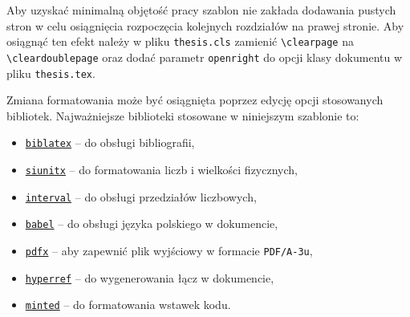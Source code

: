 Aby uzyskać minimalną objętość pracy szablon nie zakłada dodawania pustych stron w celu osiągnięcia rozpoczęcia kolejnych rozdziałów na prawej stronie. Aby osiągnąć ten efekt należy w pliku \verb|thesis.cls| zamienić \verb|\clearpage| na \verb|\cleardoublepage| oraz dodać parametr \verb|openright| do opcji klasy dokumentu w pliku \verb|thesis.tex|.

Zmiana formatowania może być osiągnięta poprzez edycję opcji stosowanych bibliotek. Najważniejsze biblioteki stosowane w niniejszym szablonie to:
\begin{itemize}
\item \texttt{\href{https://ctan.org/pkg/biblatex}{biblatex}} -- do obsługi bibliografii,
\item \texttt{\href{https://ctan.org/pkg/siunitx}{siunitx}} -- do formatowania liczb i wielkości fizycznych,
\item \texttt{\href{https://ctan.org/pkg/interval}{interval}} -- do obsługi przedziałów liczbowych,
\item \texttt{\href{https://ctan.org/pkg/babel-polish}{babel}} -- do obsługi języka polskiego w dokumencie,
\item \texttt{\href{https://ctan.org/pkg/pdfx}{pdfx}} -- aby zapewnić plik wyjściowy w formacie \verb|PDF/A-3u|,
\item \texttt{\href{https://ctan.org/pkg/hyperref}{hyperref}} -- do wygenerowania łącz w dokumencie,
\item \texttt{\href{https://ctan.org/pkg/minted}{minted}} -- do formatowania wstawek kodu.
\end{itemize}
